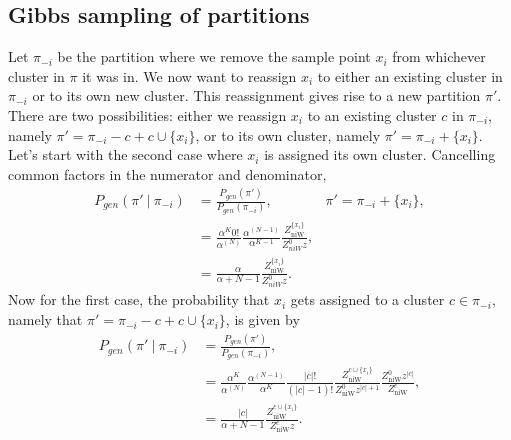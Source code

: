 \documentclass[11pt, oneside]{article}   	%
\DeclareMathOperator{\niW}{niW}
\begin{document}
\subsection{Gibbs sampling of partitions}
Let $\pi_{-i}$ be the partition where we remove the sample point $x_i$ from whichever cluster in $\pi$ it was in. We now want to reassign $x_i$ to either an existing cluster in $\pi_{-i}$ or to its own new cluster. This reassignment gives rise to a new partition $\pi'$. There are two possibilities: either we reassign $x_i$ to an existing cluster $c$ in $\pi_{-i}$, namely $\pi' = \pi_{-i} - c + c\cup\lbrace x_i\rbrace$, or to its own cluster, namely $\pi' = \pi_{-i} + \lbrace x_i\rbrace$. Let's start with the second case where $x_i$ is assigned its own cluster. Cancelling common factors in the numerator and denominator,
\begin{equation}\begin{aligned}
P_{gen}(\pi'~\vert~\pi_{-i}) &= \frac{P_{gen}(\pi')}{P_{gen}(\pi_{-i})}, &  \pi' = \pi_{-i} + \lbrace x_i\rbrace,\\
&=\frac{\alpha^K 0!}{\alpha^{(N)}}\frac{\alpha^{(N-1)}}{\alpha^{K-1}}\frac{Z^{\lbrace x_i\rbrace}_{\niW}}{Z_{niW}^0 z},\\
&= \frac{\alpha}{\alpha + N - 1}\frac{Z^{\lbrace x_i\rbrace}_{\niW}}{Z_{niW}^0 z}.
\end{aligned}\label{eq:gibbsnewcluster}\end{equation}
Now for the first case, the probability that $x_i$ gets assigned to a cluster $c\in\pi_{-i}$, namely that $\pi' = \pi_{-i} - c + c\cup\lbrace x_i\rbrace$, is given by
\begin{equation}\begin{split}
P_{gen}(\pi'~\vert~\pi_{-i}) &= \frac{P_{gen}(\pi')}{P_{gen}(\pi_{-i})}, \\
&=\frac{\alpha^K}{\alpha^{(N)}}\frac{\alpha^{(N-1)}}{\alpha^{K}}\frac{\vert c\vert!}{(\vert c\vert - 1)!}\frac{Z^{c\cup\lbrace x_i\rbrace}_{\niW}}{Z_{\niW}^0 z^{\vert c\vert + 1}}\frac{Z_{\niW}^0 z^{\vert c\vert}}{Z_{\niW}^{c}},\\
&= \frac{\vert c\vert}{\alpha + N - 1}\frac{Z_{\niW}^{c\cup\lbrace x_i\rbrace}}{Z_{\niW}^c z}.
\end{split}\label{eq:gibbsoldcluster}\end{equation}
\end{document}
